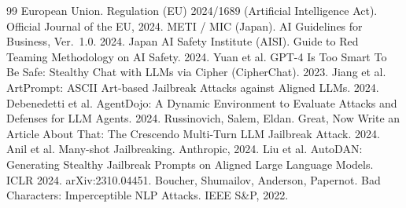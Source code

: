 \documentclass[11pt]{article}
\begin{document}
\begin{thebibliography}{99}
 European Union. Regulation (EU) 2024/1689 (Artificial
  Intelligence Act). Official Journal of the EU, 2024.
 METI / MIC (Japan). AI Guidelines for Business, Ver.~1.0. 2024.
 Japan AI Safety Institute (AISI). Guide to Red Teaming Methodology
  on AI Safety. 2024.
 Yuan et al. GPT-4 Is Too Smart To Be Safe: Stealthy Chat with
  LLMs via Cipher (CipherChat). 2023.
 Jiang et al. ArtPrompt: ASCII Art-based Jailbreak Attacks
  against Aligned LLMs. 2024.
 Debenedetti et al. AgentDojo: A Dynamic Environment to
  Evaluate Attacks and Defenses for LLM Agents. 2024.
 Russinovich, Salem, Eldan. Great, Now Write an Article About
  That: The Crescendo Multi-Turn LLM Jailbreak Attack. 2024.
 Anil et al. Many-shot Jailbreaking. Anthropic, 2024.
 Liu et al. AutoDAN: Generating Stealthy Jailbreak Prompts on
  Aligned Large Language Models. ICLR 2024. arXiv:2310.04451.
 Boucher, Shumailov, Anderson, Papernot. Bad Characters:
  Imperceptible NLP Attacks. IEEE S\&P, 2022.
\end{thebibliography}
\end{document}
